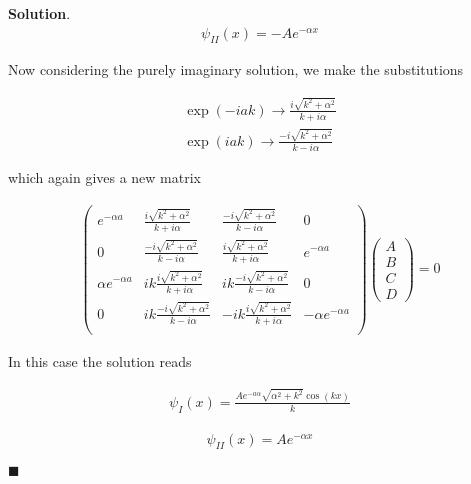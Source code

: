 \documentclass[12pt]{article}
\theoremstyle{definition}
\newenvironment{s}{%
        \begin{trivlist} \item \textbf{Solution}. }{%
            \hspace*{\fill} $\blacksquare$\end{trivlist}}%
\begin{document}
{\begin{s}
\begin{align*}
\psi_{II}(x) = -A e^{-\alpha x}
\end{align*}


Now considering the purely imaginary solution, we make the substitutions

\begin{align*}
\exp(-iak) \rightarrow \frac{i\sqrt{k^{2} + \alpha^{2}}}{k+i\alpha}\\
\exp(iak) \rightarrow \frac{-i\sqrt{k^{2} + \alpha^{2}}}{k-i\alpha}
\end{align*}

which again gives a new matrix

\begin{align*}
\begin{pmatrix}
e^{-\alpha a} & \frac{i\sqrt{k^{2} + \alpha^{2}}}{k+i\alpha} & \frac{-i\sqrt{k^{2} + \alpha^{2}}}{k-i\alpha} & 0\\
0 & \frac{-i\sqrt{k^{2} + \alpha^{2}}}{k-i\alpha} & \frac{i\sqrt{k^{2} + \alpha^{2}}}{k+i\alpha} & e^{-\alpha a}\\
\alpha e^{-\alpha a} & ik\frac{i\sqrt{k^{2} + \alpha^{2}}}{k+i\alpha} & ik\frac{-i\sqrt{k^{2} + \alpha^{2}}}{k-i\alpha} & 0\\
0 & ik\frac{-i\sqrt{k^{2} + \alpha^{2}}}{k-i\alpha} & -ik\frac{i\sqrt{k^{2} + \alpha^{2}}}{k+i\alpha} & -\alpha e^{-\alpha a}\\
\end{pmatrix}\begin{pmatrix}A\\B\\C\\D\end{pmatrix} = 0
\end{align*}

In this case the solution reads 

\begin{align*}
\psi_{I}(x) = \frac{A e^{-a \alpha } \sqrt{\alpha ^2+k^2} \cos (k x)}{k}
\end{align*}

\begin{align*}
\psi_{II}(x) = A e^{-\alpha x}
\end{align*}



\end{s}
\end{document}
